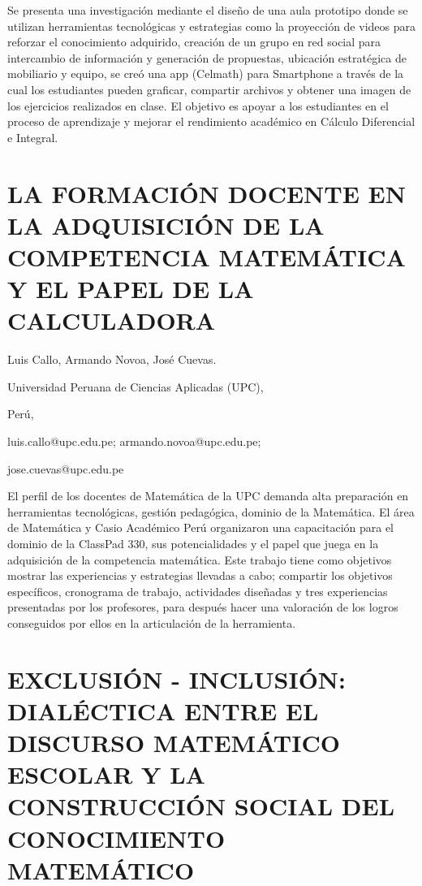 Se presenta una investigación mediante el diseño de una aula prototipo
donde se utilizan herramientas tecnológicas y estrategias como la
proyección de videos para reforzar el conocimiento adquirido, creación
de un grupo en red social para intercambio de información y generación
de propuestas, ubicación estratégica de mobiliario y equipo, se creó
una app (Celmath) para Smartphone a través de la cual los estudiantes
pueden graficar, compartir archivos y obtener una imagen de los ejercicios
realizados en clase. El objetivo es apoyar a los estudiantes en el
proceso de aprendizaje y mejorar el rendimiento académico en Cálculo
Diferencial e Integral.


\section{LA FORMACIÓN DOCENTE EN LA ADQUISICIÓN DE LA COMPETENCIA MATEMÁTICA
Y EL PAPEL DE LA CALCULADORA}

\begin{datos}

Luis Callo, Armando Novoa, José Cuevas.

Universidad Peruana de Ciencias Aplicadas (UPC),

Perú,

luis.callo@upc.edu.pe; armando.novoa@upc.edu.pe;

jose.cuevas@upc.edu.pe

\end{datos}

El perfil de los docentes de Matemática de la UPC demanda alta preparación
en herramientas tecnológicas, gestión pedagógica, dominio de la Matemática.
El área de Matemática y Casio Académico Perú organizaron una capacitación
para el dominio de la ClassPad 330, sus potencialidades y el papel
que juega en la adquisición de la competencia matemática. Este trabajo
tiene como objetivos mostrar las experiencias y estrategias llevadas
a cabo; compartir los objetivos específicos, cronograma de trabajo,
actividades diseñadas y tres experiencias presentadas por los profesores,
para después hacer una valoración de los logros conseguidos por ellos
en la articulación de la herramienta.


\section{EXCLUSIÓN - INCLUSIÓN: DIALÉCTICA ENTRE EL DISCURSO MATEMÁTICO ESCOLAR
Y LA CONSTRUCCIÓN SOCIAL DEL CONOCIMIENTO MATEMÁTICO }

